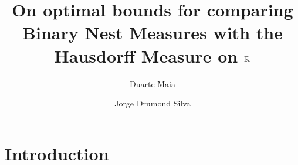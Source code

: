 \documentclass[11pt]{amsart}
\title{\textbf{On optimal bounds for comparing Binary Nest Measures with the Hausdorff Measure on $\mathbb{R}$}}
\author{Duarte Maia}
\author{Jorge Drumond Silva}
\date{}
\begin{document}
\maketitle


\begin{abstract}
\lipsum[1]
\end{abstract}


\section{Introduction}



\begin{thebibliography}{1}


\end{thebibliography}
\end{document}
